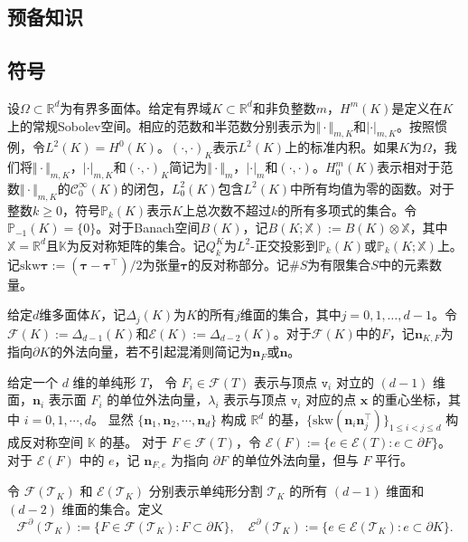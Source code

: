 \subsection{预备知识}
\subsection{符号}
设$\Omega\subset
\mathbb{R}^d$为有界多面体。给定有界域$K\subset\mathbb{R}^{d}$和非负整数$m$，$H^m(K)$是定义在$K$上的常规Sobolev空间。相应的范数和半范数分别表示为$\Vert\cdot\Vert_{m,K}$和$|\cdot|_{m,K}$。按照惯例，令$L^2(K)=H^0(K)$。$(\cdot,
\cdot)_K$表示$L^2(K)$上的标准内积。如果$K$为$\Omega$，我们将$\Vert\cdot\Vert_{m,K}$，$|\cdot|_{m,K}$和$(\cdot,
\cdot)_K$简记为$\Vert\cdot\Vert_{m}$，$|\cdot|_{m}$和$(\cdot,
\cdot)$。$H_0^m(K)$表示相对于范数$\Vert\cdot\Vert_{m,K}$的$\mathcal
C_{0}^{\infty}(K)$的闭包，$L_0^2(K)$包含$L^2(K)$中所有均值为零的函数。对于整数$k\geq0$，符号$\mathbb
P_k(K)$表示$K$上总次数不超过$k$的所有多项式的集合。令$\mathbb
P_{-1}(K)=\{0\}$。对于Banach空间$B(K)$，记$B(K;
\mathbb{X}):=B(K)\otimes\mathbb{X}$，其中$\mathbb{X}=\mathbb{R}^d$且$\mathbb{K}$为反对称矩阵的集合。记$Q_k^{K}$为$L^2$-正交投影到$\mathbb
P_k(K)$或$\mathbb P_{k}(K;
\mathbb{X})$上。记$\mathrm{skw}\boldsymbol{\tau}:=(\boldsymbol{\tau}-\boldsymbol{\tau}^{\intercal})/2$为张量$\boldsymbol{\tau}$的反对称部分。记$\#S$为有限集合$S$中的元素数量。

给定$d$维多面体$K$，记$\Delta_j(K)$为$K$的所有$j$维面的集合，其中$j=0,1,\ldots,
d-1$。令$\mathcal{F}(K):=\Delta_{d-1}(K)$和$\mathcal{E}(K):=\Delta_{d-2}(K)$。对于$\mathcal{F}(K)$中的$F$，记$\boldsymbol{n}_{K,F}$为指向$\partial
K$的外法向量，若不引起混淆则简记为$\boldsymbol{n}_F$或$\boldsymbol{n}$。

给定一个 $d$ 维的单纯形 $T$，
令 $F_i\in\mathcal F(T)$ 表示与顶点 $\texttt{v}_i$ 对立的 $(d-1)$ 维面，$\boldsymbol n_i$ 表示面 $F_i$ 的单位外法向量，$\lambda_i$ 表示与顶点 $\texttt{v}_i$ 对应的点 $\boldsymbol x$ 的重心坐标，其中 $i=0, 1, \cdots, d$。
显然 $\{ \boldsymbol n_1, \boldsymbol n_2, \cdots, \boldsymbol n_d \}$ 构成 $\mathbb R^d$ 的基，$\{\mathrm{skw}({\boldsymbol n_i\boldsymbol n_j^{\intercal}})\}_{1\leq i<j\leq d}$ 构成反对称空间 $\mathbb K$ 的基。
对于 $F\in\mathcal F(T)$，令 $\mathcal{E}(F):=\{e\in\mathcal{E}(T): e\subset\partial F\}$。
对于 $\mathcal E(F)$ 中的 $e$，记 $\boldsymbol{n}_{F,e}$ 为指向 $\partial F$ 的单位外法向量，但与 $F$ 平行。


令 $\mathcal{F}(\mathcal T_K)$ 和 $\mathcal{E}(\mathcal T_K)$ 分别表示单纯形分割 $\mathcal T_K$ 的所有 $(d-1)$ 维面和 $(d-2)$ 维面的集合。定义
\[
\mathcal{F}^{\partial}(\mathcal T_K):=\{F\in\mathcal{F}(\mathcal T_K): F\subset\partial K\},\quad \mathcal{E}^{\partial}(\mathcal T_K):=\{e\in\mathcal{E}(\mathcal T_K): e\subset\partial K\}.
\]
